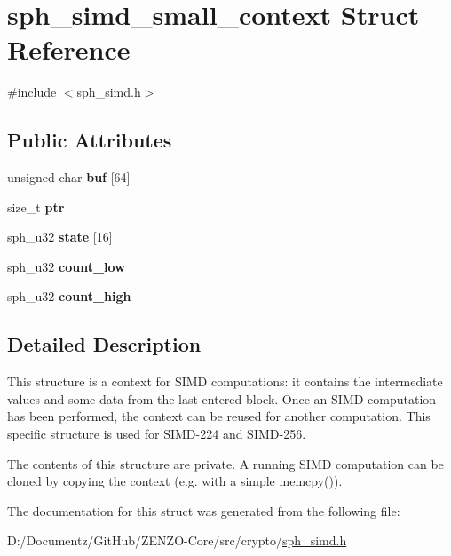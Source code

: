 \hypertarget{structsph__simd__small__context}{}\section{sph\+\_\+simd\+\_\+small\+\_\+context Struct Reference}
\label{structsph__simd__small__context}


{\ttfamily \#include $<$sph\+\_\+simd.\+h$>$}

\subsection*{Public Attributes}
\begin{DoxyCompactItemize}
\item 
\mbox{\label{structsph__simd__small__context_ad880e8f6b32fcd022c0b3bd6cf864957}} 
unsigned char {\bfseries buf} \mbox{[}64\mbox{]}
\item 
\mbox{\label{structsph__simd__small__context_ac8a2be8d4bc194be8b4cdab9cbc788b0}} 
size\+\_\+t {\bfseries ptr}
\item 
\mbox{\label{structsph__simd__small__context_a630fc1290014a94a6ba31e68075b335d}} 
sph\+\_\+u32 {\bfseries state} \mbox{[}16\mbox{]}
\item 
\mbox{\label{structsph__simd__small__context_abcf803634afa1870e3215e5f0566a20e}} 
sph\+\_\+u32 {\bfseries count\+\_\+low}
\item 
\mbox{\label{structsph__simd__small__context_aa4980f9828e1c0449f40efba36f6b903}} 
sph\+\_\+u32 {\bfseries count\+\_\+high}
\end{DoxyCompactItemize}


\subsection{Detailed Description}
This structure is a context for S\+I\+MD computations\+: it contains the intermediate values and some data from the last entered block. Once an S\+I\+MD computation has been performed, the context can be reused for another computation. This specific structure is used for S\+I\+M\+D-\/224 and S\+I\+M\+D-\/256.

The contents of this structure are private. A running S\+I\+MD computation can be cloned by copying the context (e.\+g. with a simple {\ttfamily memcpy()}). 

The documentation for this struct was generated from the following file\+:\begin{DoxyCompactItemize}
\item 
D\+:/\+Documentz/\+Git\+Hub/\+Z\+E\+N\+Z\+O-\/\+Core/src/crypto/\mbox{\hyperlink{sph__simd_8h}{sph\+\_\+simd.\+h}}\end{DoxyCompactItemize}
